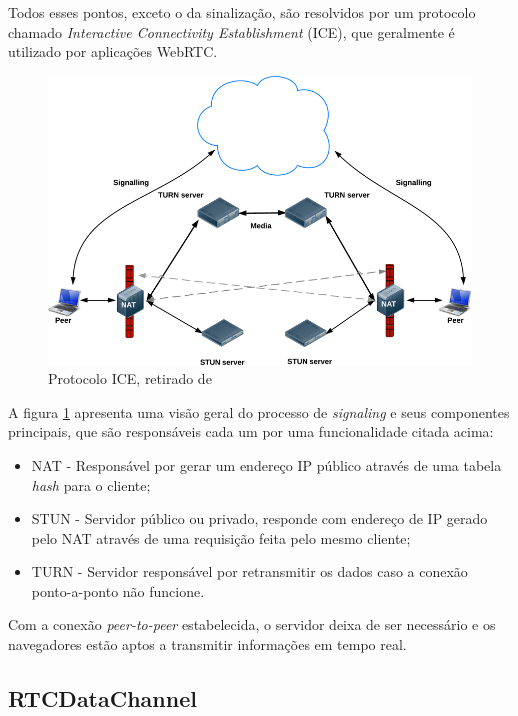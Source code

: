 Todos esses pontos, exceto o da sinalização, são resolvidos por um protocolo chamado \textit{Interactive Connectivity Establishment} (ICE), que geralmente é utilizado por aplicações WebRTC.

\begin{figure}[ht!]
	\centering
		\includegraphics[scale=0.35]{figures/overview-iceprotocol.png} 
	\caption{Protocolo ICE, retirado de \cite{webrtcarchitecture}}
	\label{fig:overview_iceprotocol}
\end{figure}

A figura \ref{fig:overview_iceprotocol} apresenta uma visão geral do processo de \textit{signaling} e seus componentes principais, que são responsáveis cada um por uma  funcionalidade citada acima:

\begin{itemize}
	\item NAT - Responsável por gerar um endereço IP público através de uma tabela \textit{hash} para o cliente;
    \item STUN - Servidor público ou privado, responde com endereço de IP gerado pelo NAT através de uma requisição feita pelo mesmo cliente;
    \item TURN - Servidor responsável por retransmitir os dados caso a conexão ponto-a-ponto não funcione.
\end{itemize}

Com a conexão \textit{peer-to-peer} estabelecida, o servidor deixa de ser necessário e os navegadores estão aptos a transmitir informações em tempo real.

\subsection{RTCDataChannel}

